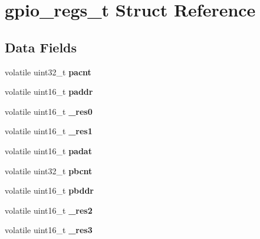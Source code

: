 \hypertarget{structgpio__regs__t}{}\section{gpio\+\_\+regs\+\_\+t Struct Reference}
\label{structgpio__regs__t}
\subsection*{Data Fields}
\begin{DoxyCompactItemize}
\item 
\mbox{\label{structgpio__regs__t_ae3dacde2a369780c18c54ad09923212a}} 
volatile uint32\+\_\+t {\bfseries pacnt}
\item 
\mbox{\label{structgpio__regs__t_a42c9e83e787609f82d4e0331c8c305b2}} 
volatile uint16\+\_\+t {\bfseries paddr}
\item 
\mbox{\label{structgpio__regs__t_a0c25edebd99aca62d9374ab8c088e239}} 
volatile uint16\+\_\+t {\bfseries \+\_\+res0}
\item 
\mbox{\label{structgpio__regs__t_a28b5098ba343ac66f129249a5a31e3ae}} 
volatile uint16\+\_\+t {\bfseries \+\_\+res1}
\item 
\mbox{\label{structgpio__regs__t_ac71becc68e71eb16e882ee0523f02a77}} 
volatile uint16\+\_\+t {\bfseries padat}
\item 
\mbox{\label{structgpio__regs__t_a693d177d7cf22115213a327b6958efee}} 
volatile uint32\+\_\+t {\bfseries pbcnt}
\item 
\mbox{\label{structgpio__regs__t_ae63e6684c27b73497b6066e71d8c41ff}} 
volatile uint16\+\_\+t {\bfseries pbddr}
\item 
\mbox{\label{structgpio__regs__t_aad921196b64028bf8cd1194f4d27fbe3}} 
volatile uint16\+\_\+t {\bfseries \+\_\+res2}
\item 
\mbox{\label{structgpio__regs__t_a4c9690d5fa1e07ec742a737088683225}} 
volatile uint16\+\_\+t {\bfseries \+\_\+res3}

\end{DoxyCompactItemize}
